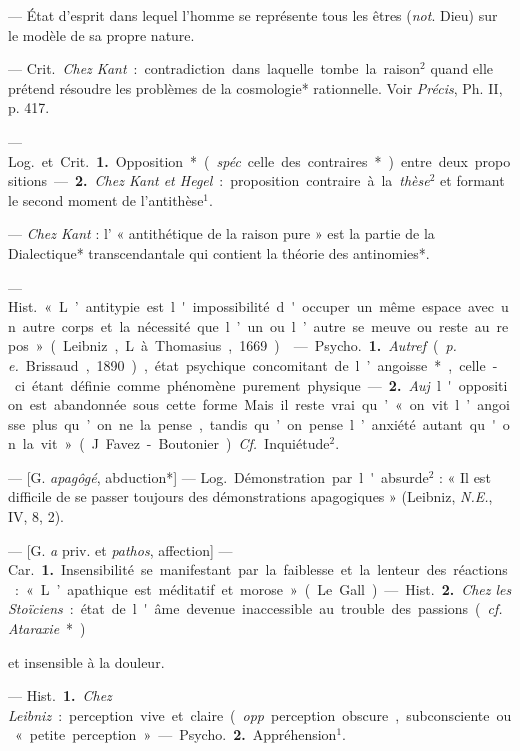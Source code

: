 \begin{itemize}[leftmargin=1cm, label=, itemsep=1pt]
{ — État d'esprit
dans lequel l'homme se représente
tous les êtres ({\it not}. Dieu) sur le
modèle de sa propre nature.

 — \si{Crit.} {\it Chez Kant} : contradiction
dans laquelle tombe la
raison$^2$ quand elle prétend résoudre
les problèmes de la cosmologie*
rationnelle. Voir {\it Précis}, Ph. II,
p. 417.

 — \si{Log.} et \si{Crit.} {\bf 1.} Opposition*
({\it spéc}. celle des contraires*) entre
deux propositions. — {\bf 2.} {\it Chez Kant
et Hegel} : proposition contraire à la
{\it thèse}$^2$ et formant le second moment
de l’antithèse$^1$.

 — {\it Chez Kant} : l’ « antithétique de la raison pure » est la
partie de la Dialectique* transcendantale qui contient la théorie des
antinomies*.

 — \si{Hist.} « L’antitypie est
l'impossibilité d'occuper un même
espace avec un autre corps et la
nécessité que l’un ou l’autre se
meuve ou reste au repos » (Leibniz,
L. à Thomasius, 1669).

 — \si{Psycho.} {\bf 1.} {\it Autref}. ({\it p. e.}
Brissaud, 1890), état psychique
concomitant de l’angoisse*, celle-ci
étant définie comme phénomène
purement physique. — {\bf 2.} {\it Auj}.
l'opposition est abandonnée sous
cette forme. Mais il reste vrai qu’ « on
vit l’angoisse plus qu’on ne la pense,
tandis qu’on pense l’anxiété autant
qu'on la vit » (J. Favez-Boutonier).
{\it Cf.}  Inquiétude$^2$.

 — [G. {\it apagôgé}, abduction*]
— \si{Log.} Démonstration par l'absurde$^2$ : « Il est
difficile de se passer toujours des
démonstrations apagogiques » (Leibniz, {\it N.E.}, IV, 8, 2).

 — [G. {\it a} priv. et {\it pathos}, affection]
— \si{Car.} {\bf 1.} Insensibilité se
manifestant par la faiblesse et la
lenteur des réactions : « L’apathique
est méditatif et morose » (Le Gall).

— \si{Hist.} {\bf 2.} {\it Chez les Stoïciens} : état
de l'âme devenue inaccessible au
trouble des passions ({\it cf.}  {\it Ataraxie}*)}
et insensible à la douleur.

 — \si{Hist.} {\bf 1.} {\it Chez Leibniz} :
perception vive et claire ({\it opp}. perception obscure, subconsciente ou
« petite perception ». — \si{Psycho.}
 {\bf 2.} Appréhension$^1$.


\end{itemize}
